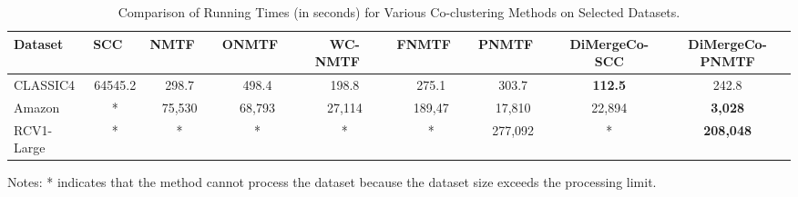\documentclass[journal]{IEEEtran}
\renewcommand{\cite}[1]{~\autocite{#1}}
\begin{document}
\begin{table}[htbp]
    \centering
    \caption{Comparison of Running Times (in seconds) for Various Co-clustering Methods on Selected Datasets.}
    \label{tab:running-time}
    \begin{tabular}{@{} l cccccccc @{}}
        \toprule
        Dataset    & SCC~\cite{dhillon2001CoclusteringDocumentsWords}
                   & NMTF~\cite{long2005CoclusteringBlockValue}
                   & ONMTF~\cite{ding2006OrthogonalNonnegativeMatrix}
                   & WC-NMTF~\cite{salah2018WordCooccurrenceRegularized}
                   & FNMTF~\cite{kim2011FastNonnegativeMatrix}
                   & PNMTF~\cite{chen2023ParallelNonNegativeMatrix}      & \textbf{DiMergeCo-SCC} & \textbf{DiMergeCo-PNMTF}                                                                 \\
        \midrule
        CLASSIC4   & 64545.2                                             & 298.7                  & 498.4                    & 198.8  & 275.1  & 303.7   & \textbf{112.5} & 242.8            \\
        Amazon     & *                                                   & 75,530                 & 68,793                   & 27,114 & 189,47 & 17,810  & 22,894         & \textbf{3,028}   \\
        RCV1-Large & *                                                   & *                      & *                        & *      & *      & 277,092 & *              & \textbf{208,048} \\
        \bottomrule
    \end{tabular}
    \begin{tablenotes}
        \small
        \item Notes: * indicates that the method cannot process the dataset because the dataset size exceeds the processing limit.
    \end{tablenotes}
\end{table}
\end{document}
